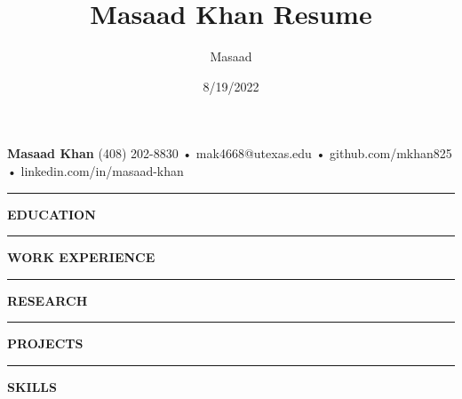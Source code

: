 \documentclass[12pt, a4paper]{article}
\title{Masaad Khan Resume}
\author{Masaad}
\date{8/19/2022}
\newcommand\jobDist{-2 mm}
\newcommand\titleheadersize{11}
\begin{document}
%
%
{\fontsize{20}{24}\selectfont \textbf{\hfil Masaad Khan \hfil}}\newline\vspace{-5mm}\newline
{\fontsize{\titleheadersize}{14}}\newline\vspace{-6mm}\newline
{\fontsize{\titleheadersize}{14}\selectfont \hspace*{0mm}\hfil (408) 202-8830 • mak4668@utexas.edu • github.com/mkhan825 • linkedin.com/in/masaad-khan \hfil}\newline\vspace{-7mm}\newline
%
%
\rule{19.5cm}{0.4pt}\vspace{-0.75mm}\newline
\noindent\textbf{{\fontsize{12}{14}\selectfont EDUCATION}}
\vspace{-1mm}\newline

\vspace{-1mm}
%
%
\noindent\rule{19.5cm}{0.4pt}
\noindent\textbf{{\fontsize{12}{14}\selectfont WORK EXPERIENCE}}
\vspace{2mm}\newline
%
%

\vspace{\jobDist}

\vspace{\jobDist}

\vspace{-1mm}
%
%
\noindent\rule{19.5cm}{0.4pt}
\noindent\textbf{{\fontsize{12}{14}\selectfont RESEARCH}}\newline
\vspace{-4.5mm}\newline
%

\vspace{-1mm}
%
%
\noindent\rule{19.5cm}{0.4pt}
\noindent\textbf{{\fontsize{12}{14}\selectfont PROJECTS}}\newline
\vspace{-3.5mm}\newline
%
%

\vspace{-2mm}\newline
%
%

\vspace{-2mm}
%
%

\vspace{-6mm}\newline
\vspace{-1mm}
%
%
\noindent\rule{19.5cm}{0.4pt}
\noindent\textbf{{\fontsize{12}{14}\selectfont SKILLS}}\newline

\vspace{0cm}
%
%
\end{document}

